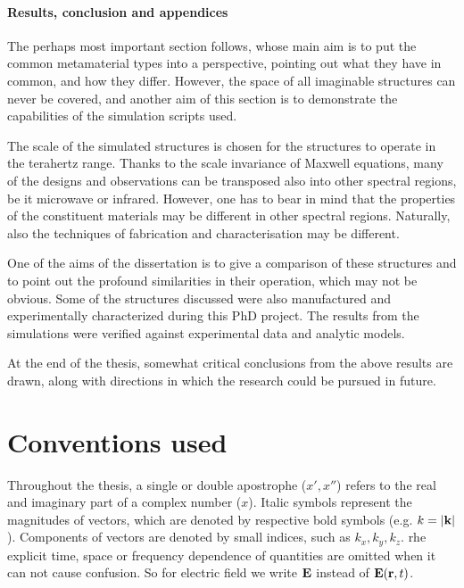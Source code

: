 \paragraph{Results, conclusion and appendices} %
The perhaps most important section follows, 
whose main aim is to put the common metamaterial types into a perspective, pointing out what they have in common, and how they differ. 
However, the space of all imaginable structures can never be covered, and another aim of this section is to demonstrate the capabilities of the simulation scripts used. 

The scale of the simulated structures is chosen for the structures to operate in the terahertz range. 
Thanks to the scale invariance of Maxwell equations, many of the designs and observations can be transposed also into other spectral regions, be it microwave or infrared. However, one has to bear in mind that the properties of the constituent materials may be different in other spectral regions. Naturally, also the techniques of fabrication and characterisation may be different.

One of the aims of the dissertation is to give a comparison of these structures and to point out the profound similarities in their operation, which may not be obvious.  Some of the structures discussed were also manufactured and experimentally characterized during this PhD project. 
The results from the simulations were verified against experimental data and analytic models.

At the end of the thesis, somewhat critical conclusions from the above results are drawn, along with directions in which the research could be pursued in future.


\section{Conventions used}%
Throughout the thesis, a single or double apostrophe ($x', x''$) refers to the real and imaginary part of a complex number ($x$). Italic symbols represent the magnitudes of vectors, which are denoted by respective bold symbols (e.g. $k = |{\mathbf{k}}|$). Components of vectors are denoted by small indices, such as $k_x, k_y, k_z$. 
rhe explicit time, space or frequency dependence of quantities are omitted when it can not cause confusion. So for electric field we write $\mathbf{E}$ instead of $\mathbf{E}({\mathbf{r}},t)$.

